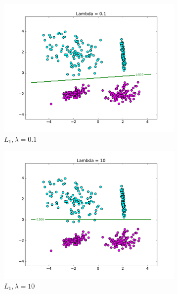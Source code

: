 \documentclass[10pt,psamsfonts]{amsart}
\theoremstyle{definition}
\theoremstyle{remark}
\numberwithin{equation}{section}
\begin{document}
\begin{figure}
	\centering
	\begin{subfigure}[b]{0.23\textwidth}
		\includegraphics[width=\textwidth]{hw2_1-2_4.pdf}
		\caption{$L_1, \lambda = 0.1$}
	\end{subfigure}
	\begin{subfigure}[b]{0.23\textwidth}
		\includegraphics[width=\textwidth]{hw2_1-2_6.pdf}
		\caption{$L_1, \lambda = 10$}
	\end{subfigure}
	\begin{subfigure}[b]{0.23\textwidth}

\end{subfigure}
\end{figure}
\end{document}
